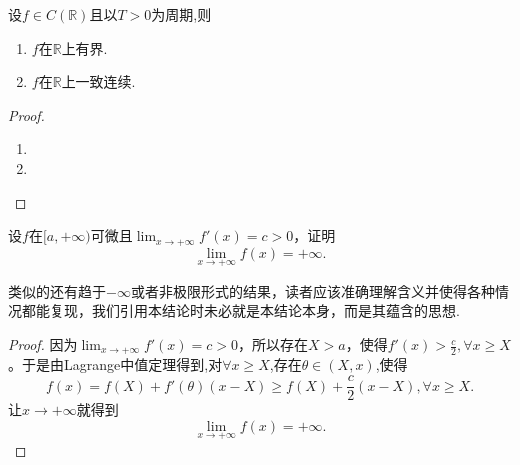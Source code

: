 \documentclass[../../main.tex]{subfiles}
\begin{document}
\begin{proposition}[连续的周期函数的基本性质]\label{proposition:连续的周期函数的基本性质}
设$f\in C(\mathbb{R})$且以$T>0$为周期,则
\begin{enumerate}[(1)]
\item $f$在$\mathbb{R}$上有界.

\item $f$在$\mathbb{R}$上一致连续.
\end{enumerate}
\end{proposition}
\begin{proof}
\begin{enumerate}[(1)]
\item 

\item 
\end{enumerate}
\end{proof}

\begin{proposition}[导数有正增长率则函数爆炸]\label{proposition:导数有正增长率则函数爆炸}
设\(f\)在\([a,+\infty)\)可微且\(\lim_{x\rightarrow +\infty}f'(x)=c > 0\)，证明
\[\lim_{x\rightarrow +\infty}f(x)=+\infty.\]
\end{proposition}
\begin{note}
类似的还有趋于\(-\infty\)或者非极限形式的结果，读者应该准确理解含义并使得各种情况都能复现，我们引用本结论时未必就是本结论本身，而是其蕴含的思想.
\end{note}
\begin{proof}
因为\(\lim_{x\rightarrow +\infty}f'(x)=c > 0\)，所以存在\(X > a\)，使得\(f'(x)>\frac{c}{2},\forall x\geqslant X\)。于是由Lagrange中值定理得到,对$\forall x\geqslant X$,存在$\theta \in (X,x)$,使得
\[f(x)=f(X)+f'(\theta)(x - X)\geqslant f(X)+\frac{c}{2}(x - X),\forall x\geqslant X.\]
让\(x\rightarrow +\infty\)就得到
\[\lim_{x\rightarrow +\infty}f(x)=+\infty.\]
\end{proof}
\end{document}
